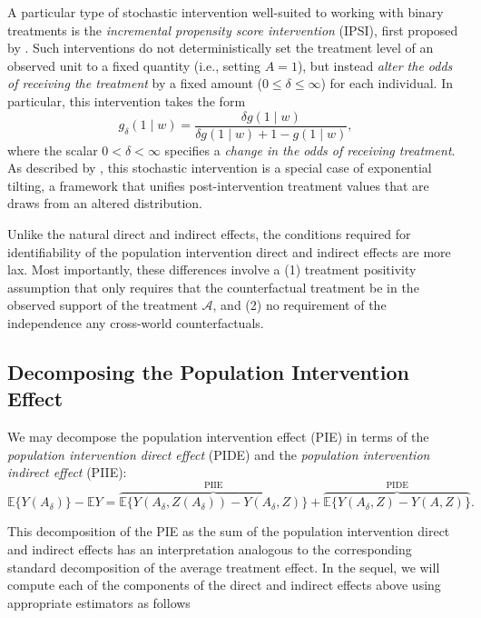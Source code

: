\documentclass[
  12pt, krantz2,
]{krantz}
\newcommand{\1}{\mathbbm{1}}
\theoremstyle{definition}
\theoremstyle{definition}
\theoremstyle{definition}
\theoremstyle{definition}
\theoremstyle{remark}
\begin{document}
A particular type of stochastic intervention well-suited to working with binary
treatments is the \emph{incremental propensity score intervention} (IPSI), first
proposed by \citet{kennedy2019nonparametric}. Such interventions do not
deterministically set the treatment level of an observed unit to a fixed
quantity (i.e., setting \(A = 1\)), but instead \emph{alter the odds of receiving the
treatment} by a fixed amount (\(0 \leq \delta \leq \infty\)) for each individual.
In particular, this intervention takes the form
\begin{equation*}
  g_{\delta}(1 \mid w) = \frac{\delta g(1 \mid w)}{\delta g(1 \mid w) + 1
  - g(1\mid w)},
\end{equation*}
where the scalar \(0 < \delta < \infty\) specifies a \emph{change in the odds of
receiving treatment}. As described by \citet{diaz2020causal}, this stochastic
intervention is a special case of exponential tilting, a framework that unifies
post-intervention treatment values that are draws from an altered distribution.

Unlike the natural direct and indirect effects, the conditions required for
identifiability of the population intervention direct and indirect effects are
more lax. Most importantly, these differences involve a (1) treatment positivity
assumption that only requires that the counterfactual treatment be in the
observed support of the treatment \(\mathcal{A}\), and (2) no requirement of the
independence any cross-world counterfactuals.

\hypertarget{decomposing-the-population-intervention-effect}{%
\subsection{Decomposing the Population Intervention Effect}\label{decomposing-the-population-intervention-effect}}

We may decompose the population intervention effect (PIE) in terms of the
\emph{population intervention direct effect} (PIDE) and the \emph{population
intervention indirect effect} (PIIE):
\begin{equation*}
  \mathbb{E}\{Y(A_\delta)\} - \mathbb{E}Y =
    \overbrace{\mathbb{E}\{Y(A_\delta, Z(A_\delta))
      - Y(A_\delta, Z)\}}^{\text{PIIE}} +
    \overbrace{\mathbb{E}\{Y(A_\delta, Z) - Y(A, Z)\}}^{\text{PIDE}}.
\end{equation*}

This decomposition of the PIE as the sum of the population intervention direct
and indirect effects has an interpretation analogous to the corresponding
standard decomposition of the average treatment effect. In the sequel, we will
compute each of the components of the direct and indirect effects above using
appropriate estimators as follows
\end{document}
